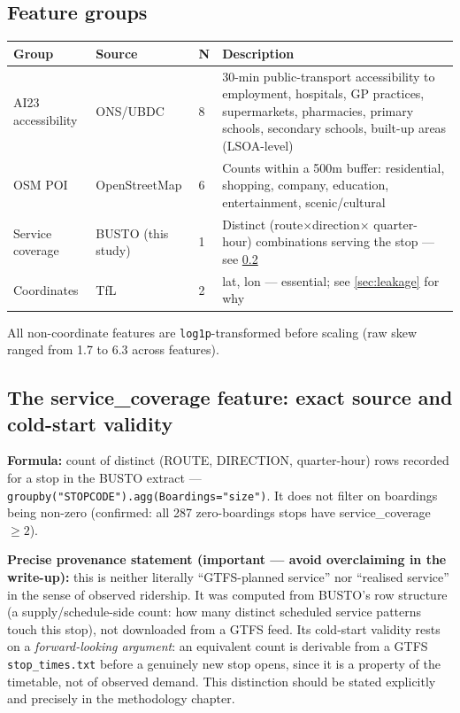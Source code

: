 \documentclass[11pt]{article}
\let\oldsubsection\subsection
\renewcommand{\subsection}[1]{\oldsubsection{\color{sectcolor}#1}}
\begin{document}
\subsection{Feature groups}
\begin{center}
\begin{tabular}{@{}p{3.2cm}p{2.8cm}p{1cm}p{7cm}@{}}
\toprule
\textbf{Group} & \textbf{Source} & \textbf{N} & \textbf{Description} \\
\midrule
AI23 accessibility & ONS/UBDC & 8 & 30-min public-transport accessibility to employment,
hospitals, GP practices, supermarkets, pharmacies, primary schools, secondary schools,
built-up areas (LSOA-level) \\
OSM POI & OpenStreetMap & 6 & Counts within a 500m buffer: residential, shopping, company,
education, entertainment, scenic/cultural \\
Service coverage & BUSTO (this study) & 1 & Distinct (route$\times$direction$\times$
quarter-hour) combinations serving the stop --- see \ref{sec:sc} \\
Coordinates & TfL & 2 & lat, lon --- essential; see \ref{sec:leakage} for why \\
\bottomrule
\end{tabular}
\end{center}
All non-coordinate features are \texttt{log1p}-transformed before scaling (raw skew ranged
from 1.7 to 6.3 across features).

\subsection{The service\_coverage feature: exact source and cold-start validity}
\label{sec:sc}
\textbf{Formula:} count of distinct (ROUTE, DIRECTION, quarter-hour) rows recorded for a
stop in the BUSTO extract --- \texttt{groupby("STOPCODE").agg(Boardings="size")}. It does
not filter on boardings being non-zero (confirmed: all 287 zero-boardings stops have
service\_coverage $\geq 2$).

\textbf{Precise provenance statement (important --- avoid overclaiming in the write-up):}
this is neither literally ``GTFS-planned service'' nor ``realised service'' in the sense of
observed ridership. It was computed from BUSTO's row structure (a supply/schedule-side
count: how many distinct scheduled service patterns touch this stop), not downloaded from a
GTFS feed. Its cold-start validity rests on a \emph{forward-looking argument}: an equivalent
count is derivable from a GTFS \texttt{stop\_times.txt} before a genuinely new stop opens,
since it is a property of the timetable, not of observed demand. This distinction should be
stated explicitly and precisely in the methodology chapter.
\end{document}
